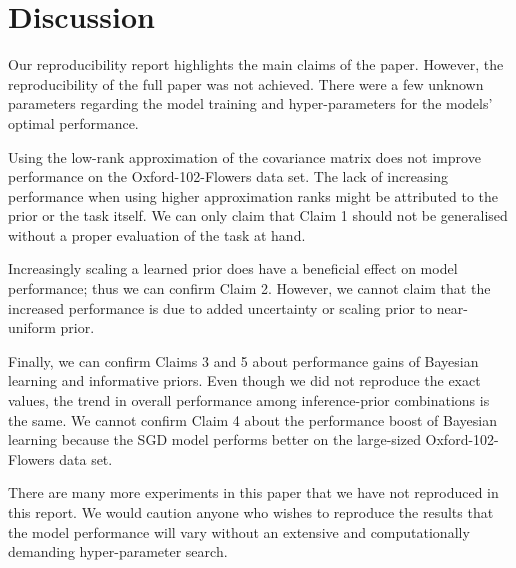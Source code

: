 
\section{Discussion}


Our reproducibility report highlights the main claims of the paper. However, the reproducibility of the full paper was not achieved.
There were a few unknown parameters regarding the model training and hyper-parameters for the models' optimal performance. 

Using the low-rank approximation of the covariance matrix does not improve performance on the Oxford-102-Flowers data set. The lack of increasing performance when using higher approximation ranks might be attributed to the prior or the task itself. We can only claim that Claim 1 should not be generalised without a proper evaluation of the task at hand.

Increasingly scaling a learned prior does have a beneficial effect on model performance; thus we can confirm Claim 2. However, we cannot claim that the increased performance is due to added uncertainty or scaling prior to near-uniform prior.

Finally, we can confirm Claims 3 and 5 about performance gains of Bayesian learning and informative priors. Even though we did not reproduce the exact values, the trend in overall performance among inference-prior combinations is the same. We cannot confirm Claim 4 about the performance boost of Bayesian learning because the SGD model performs better on the large-sized Oxford-102-Flowers data set.

There are many more experiments in this paper that we have not reproduced in this report. We would caution anyone who wishes to reproduce the results that the model performance will vary without an extensive and computationally demanding hyper-parameter search. 


